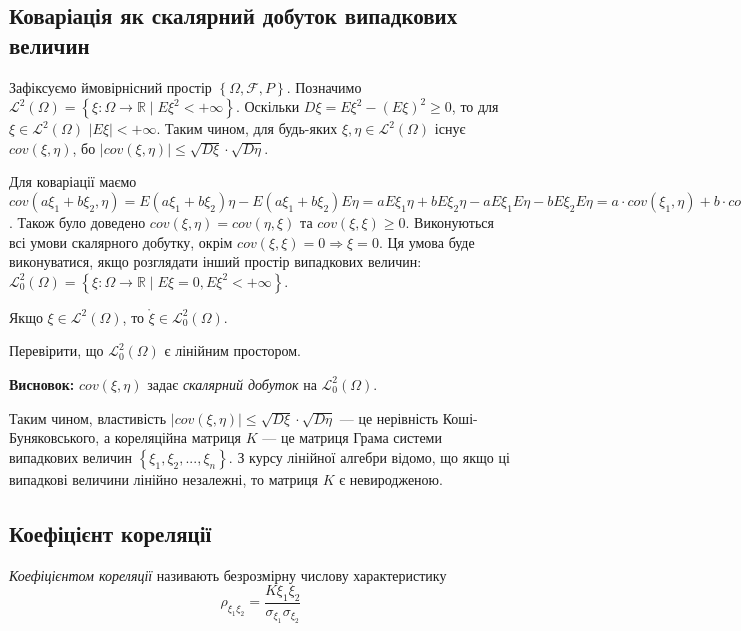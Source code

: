 \subsection{Коваріація як скалярний добуток випадкових величин}
Зафіксуємо ймовірнісний простір $\left\{\Omega, \mathcal{F}, P\right\}$.
Позначимо $\mathcal{L}^2(\Omega) = \left\{\xi : \Omega \rightarrow \mathbb{R} \;|\; E\xi^2 < +\infty\right\}$.
Оскільки $D\xi = E\xi^2 - (E\xi)^2 \geq 0$, то для $\xi \in \mathcal{L}^2(\Omega)$ $|E\xi| < +\infty$.
Таким чином, для будь-яких $\xi, \eta \in \mathcal{L}^2(\Omega)$ 
існує ${cov}(\xi,\eta)$, бо $|{cov}(\xi,\eta)| \leq \sqrt{D\xi} \cdot \sqrt{D\eta}$.

Для коваріації маємо 
${cov}(a\xi_1 + b\xi_2,\eta) = E(a\xi_1+b\xi_2)\eta - E(a\xi_1 + b\xi_2)E\eta = 
a E\xi_1\eta + b E\xi_2\eta - a E\xi_1 E\eta - b E\xi_2 E\eta = a\cdot{cov}(\xi_1,\eta) + b\cdot{cov}(\xi_2,\eta)$.
Також було доведено ${cov}(\xi, \eta) = {cov}(\eta, \xi)$ та ${cov}(\xi, \xi) \geq 0$.
Виконуються всі умови скалярного добутку, окрім ${cov}(\xi, \xi) = 0 \Rightarrow \xi = 0$.
Ця умова буде виконуватися, якщо розглядати інший простір випадкових величин:
$\mathcal{L}_0^2(\Omega) = \left\{\xi : \Omega \rightarrow \mathbb{R} \;|\; E\xi = 0, E\xi^2 < +\infty\right\}$.
\begin{remark}
    Якщо $\xi \in \mathcal{L}^2(\Omega)$, то $\mathring{\xi} \in \mathcal{L}_0^2(\Omega)$.
\end{remark}
\begin{exercise}
    Перевірити, що $\mathcal{L}_0^2(\Omega)$ є лінійним простором.
\end{exercise}

\noindent \textbf{Висновок:} ${cov}(\xi, \eta)$ задає \emph{скалярний добуток} на $\mathcal{L}_0^2(\Omega)$.

Таким чином, властивість $|{cov}(\xi,\eta)| \leq \sqrt{D\xi} \cdot \sqrt{D\eta}$ ---
це нерівність Коші-Буняковського, а кореляційна матриця $K$ --- це матриця Грама системи
випадкових величин $\left\{\xi_1, \xi_2, ..., \xi_n\right\}$.
З курсу лінійної алгебри відомо, що якщо ці випадкові величини лінійно незалежні, то матриця $K$ є невиродженою.

\subsection{Коефіцієнт кореляції}
\begin{definition}
    \emph{Коефіцієнтом кореляції} називають безрозмірну числову характеристику
    \begin{equation*}
        \rho_{\xi_1\xi_2} = \frac{K\xi_1\xi_2}{\sigma_{\xi_1}\sigma_{\xi_2}}
    \end{equation*}
\end{definition}

